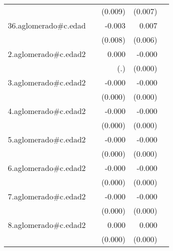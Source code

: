 {\begin{longtable}{l*{4}{D{.}{.}{-1}}}
            &                     &     (0.009)         &     (0.007)         &                     \\
\addlinespace
36.aglomerado#c.edad&                     &      -0.003         &       0.007         &                     \\
            &                     &     (0.008)         &     (0.006)         &                     \\
\addlinespace
2.aglomerado#c.edad2&                     &       0.000         &      -0.000         &                     \\
            &                     &         (.)         &     (0.000)         &                     \\
\addlinespace
3.aglomerado#c.edad2&                     &      -0.000\sym{*}  &      -0.000\sym{***}&                     \\
            &                     &     (0.000)         &     (0.000)         &                     \\
\addlinespace
4.aglomerado#c.edad2&                     &      -0.000         &      -0.000\sym{***}&                     \\
            &                     &     (0.000)         &     (0.000)         &                     \\
\addlinespace
5.aglomerado#c.edad2&                     &      -0.000         &      -0.000         &                     \\
            &                     &     (0.000)         &     (0.000)         &                     \\
\addlinespace
6.aglomerado#c.edad2&                     &      -0.000         &      -0.000\sym{**} &                     \\
            &                     &     (0.000)         &     (0.000)         &                     \\
\addlinespace
7.aglomerado#c.edad2&                     &      -0.000         &      -0.000\sym{*}  &                     \\
            &                     &     (0.000)         &     (0.000)         &                     \\
\addlinespace
8.aglomerado#c.edad2&                     &       0.000         &       0.000         &                     \\
            &                     &     (0.000)         &     (0.000)         &                     \\

\end{longtable}}
